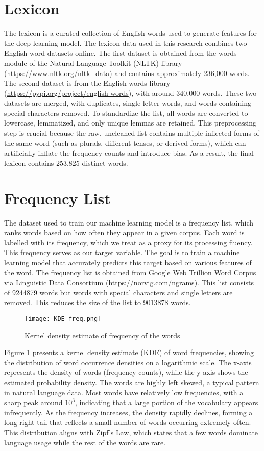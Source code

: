 \documentclass[a4paper,11pt]{report}
\begin{document}
\section{Lexicon} \label{sec:lexicon}
The lexicon is a curated collection of English words used to generate features for the deep learning model. The lexicon data used in this research combines two English word datasets online. The first dataset is obtained from the words module of the Natural Language Toolkit (NLTK) library (\url{https://www.nltk.org/nltk_data}) and contains approximately 236,000 words. The second dataset is from the English-words library (\url{https://pypi.org/project/english-words}), with around 340,000 words. These two datasets are merged, with duplicates, single-letter words, and words containing special characters removed. To standardize the list, all words are converted to lowercase, lemmatized, and only unique lemmas are retained. This preprocessing step is crucial because the raw, uncleaned list contains multiple inflected forms of the same word (such as plurals, different tenses, or derived forms), which can artificially inflate the frequency counts and introduce bias. As a result, the final lexicon contains 253,825 distinct words. 

\section{Frequency List} \label{sec:frequency}
The dataset used to train our machine learning model is a frequency list, which ranks words based on how often they appear in a given corpus. Each word is labelled with its frequency, which we treat as a proxy for its processing fluency. This frequency serves as our target variable. The goal is to train a machine learning model that accurately predicts this target based on various features of the word. The frequency list is obtained from Google Web Trillion Word Corpus via Linguistic Data Consortium (\url{https://norvig.com/ngrams}). This list consists of 9244879 words but words with special characters and single letters are removed. This reduces the size of the list to 9013878 words. 

\begin{figure}[h!]
    \centering
    \texttt{[image: KDE\_freq.png]}
    \caption{Kernel density estimate of frequency of the words}
    \label{fig:word_freq}
\end{figure}

Figure \ref{fig:word_freq} presents a kernel density estimate (KDE) of word frequencies, showing the distribution of word occurrence densities on a logarithmic scale. The x-axis represents the density of words (frequency counts), while the y-axis shows the estimated probability density. The words are highly left skewed, a typical pattern in natural language data. Most words have relatively low frequencies, with a sharp peak around $10^3$, indicating that a large portion of the vocabulary appears infrequently. As the frequency increases, the density rapidly declines, forming a long right tail that reflects a small number of words occurring extremely often. This distribution aligns with Zipf’s Law, which states that a few words dominate language usage while the rest of the words are rare. 
\end{document}
